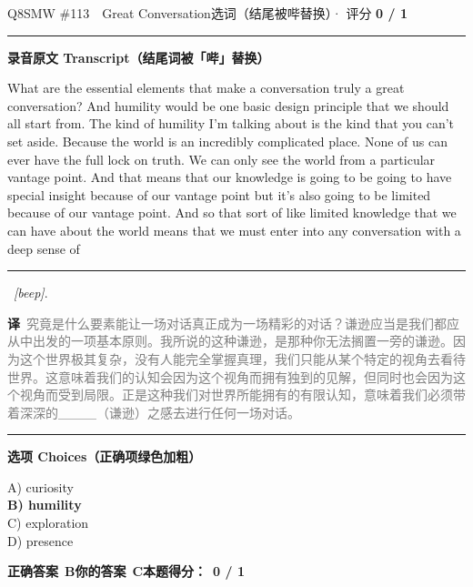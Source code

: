 \documentclass[11pt]{article}
\newcommand{\ptesub}[1]{%
  \par\needspace{2\baselineskip}\smallskip
  {\color{cAccent}\rule[-0.2ex]{3pt}{1.05em}}\hspace{6pt}%
  {\bfseries\color{cHead}#1}\par\nopagebreak\smallskip}
\newcommand{\zh}[1]{{\footnotesize\textcolor{cNote}{\textbf{译}}\ \textcolor{gray}{#1}}}
\begin{document}
\begin{qblock}{Q8\quad SMW \#113\ \ Great Conversation}{选词（结尾被哔替换）· 评分 \textcolor{cAccent}{\bfseries 0 / 1}}
\ptesub{录音原文 Transcript（结尾词被「哔」替换）}
\begin{promptbox}
What are the essential elements that make a conversation truly a great conversation? And humility would be one basic design principle that we should all start from. The kind of humility I'm talking about is the kind that you can't set aside. Because the world is an incredibly complicated place. None of us can ever have the full lock on truth. We can only see the world from a particular vantage point. And that means that our knowledge is going to be going to have special insight because of our vantage point but it's also going to be limited because of our vantage point. And so that sort of like limited knowledge that we can have about the world means that we must enter into any conversation with a deep sense of \rule[0.3ex]{1.2cm}{0.4pt}\ \textit{[beep]}.
\end{promptbox}
\zh{究竟是什么要素能让一场对话真正成为一场精彩的对话？谦逊应当是我们都应从中出发的一项基本原则。我所说的这种谦逊，是那种你无法搁置一旁的谦逊。因为这个世界极其复杂，没有人能完全掌握真理，我们只能从某个特定的视角去看待世界。这意味着我们的认知会因为这个视角而拥有独到的见解，但同时也会因为这个视角而受到局限。正是这种我们对世界所能拥有的有限认知，意味着我们必须带着深深的＿＿＿（谦逊）之感去进行任何一场对话。}
\ptesub{选项 Choices（正确项绿色加粗）}
{\small
A) curiosity\\
{\color{cFix}\textbf{B) humility}}\\
C) exploration\\
D) presence}
\par\smallskip
\textbf{正确答案}\ \textcolor{cFix}{\bfseries B}\qquad\textbf{你的答案}\ {\color{cWrong}\bfseries C}\qquad\textbf{本题得分：}\ {\color{cAccent}\bfseries 0 / 1}
\end{qblock}
\end{document}
